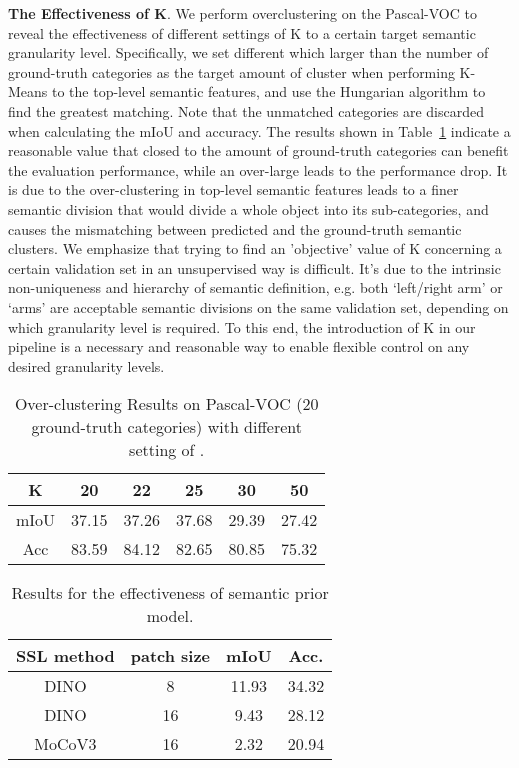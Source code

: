 \documentclass[runningheads]{llncs}
\newcommand{\PAR}[1]{\smallskip \noindent \textbf{#1}}
\newcommand{\tabref}[1]{Table~\ref{#1}}
\begin{document}
\PAR{The Effectiveness of K}. We perform overclustering on the Pascal-VOC to reveal the effectiveness of different settings of K to a certain target semantic granularity level. 
Specifically, we set different  which larger than the number of ground-truth categories as the target amount of cluster when performing K-Means to the top-level semantic features, and use the Hungarian algorithm to find the greatest matching. Note that the unmatched categories are discarded when calculating the mIoU and accuracy. The results shown in \tabref{tab:overclustering} indicate a reasonable  value that closed to the amount of ground-truth categories can benefit the evaluation performance, while an over-large  leads to the performance drop. It is due to the over-clustering in top-level semantic features leads to a finer semantic division that would divide a whole object into its sub-categories, and causes the mismatching between predicted and the ground-truth semantic clusters. We emphasize that trying to find an 'objective' value of K concerning a certain validation set in an unsupervised way is difficult. It’s due to the intrinsic non-uniqueness and hierarchy of semantic definition, e.g. both ‘left/right arm’ or ‘arms’ are acceptable semantic divisions on the same validation set, depending on which granularity level is required. To this end, the introduction of K in our pipeline is a necessary and reasonable way to enable flexible control on any desired granularity levels.


\begin{multicols}{2}



\begin{table}[H]
    \centering
    \small
    \caption{Over-clustering Results on Pascal-VOC (20 ground-truth categories) with different setting of .\label{tab:overclustering}}
    \begin{tabular}{c|ccccc}
        \toprule
        {K} & {20} & {22} & {25} & {30} & {50} \tabularnewline
        \midrule
        {mIoU}  & 37.15 & 37.26 & 37.68 & 29.39 & 27.42  \tabularnewline
        {Acc}  & 83.59 & 84.12 & 82.65 & 80.85 & 75.32 \tabularnewline
        \bottomrule
    \end{tabular}
\end{table}

\begin{table}[H]
    \centering 
    \small
    \caption{Results for the effectiveness of semantic prior model.\label{tab:ab:semantic_prior}}
    \begin{tabular}{cc|cc}
        \toprule
        {SSL method} & {patch size} & {mIoU} & {Acc.} \tabularnewline
        \midrule
        DINO & 8 & 11.93 & 34.32 \tabularnewline
        DINO & 16 & 9.43 & 28.12 \tabularnewline
        MoCoV3 & 16 & 2.32 & 20.94 \tabularnewline
        \bottomrule
    \end{tabular}
\end{table}





\end{multicols}
\end{document}
